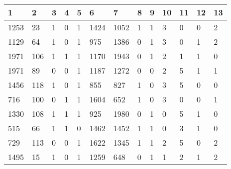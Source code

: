 \begin{table}[H]
\begin{tabular}{|l|l|l|l|l|l|l|l|l|l|l|l|l|}
\hline
\textbf{1} & \textbf{2} & \textbf{3} & \textbf{4} & \textbf{5} & \textbf{6} & \textbf{7} & \textbf{8} & \textbf{9} & \textbf{10} & \textbf{11} & \textbf{12} & \textbf{13} \\ \hline
1253       & 23         & 1          & 0          & 1          & 1424       & 1052       & 1          & 1          & {\color[HTML]{FE0000}3}           & 0           & 0           & 2           \\ \hline
1129       & 64         & 1          & 0          & 1          & 975        & 1386       & 0          & 1          & {\color[HTML]{FE0000}3}           & 0           & 1           & 2           \\ \hline
1971       & 106        & 1          & 1          & 1          & 1170       & 1943       & 0          & 1          & 2           & 1           & 1           & 0           \\ \hline
1971       & 89         & 0          & 0          & 1          & 1187       & 1272       & 0          & 0          & 2           & {\color[HTML]{FE0000}5}           & 1           & 1           \\ \hline
1456       & 118        & 1          & 0          & 1          & 855        & 827        & 1          & 0          & {\color[HTML]{FE0000}3}           & {\color[HTML]{FE0000}5}           & 0           & 0           \\ \hline
716        & 100        & 0          & 1          & 1          & 1604       & 652        & 1          & 0          & {\color[HTML]{FE0000}3}           & 0           & 0           & 1           \\ \hline
1330       & 108        & 1          & 1          & 1          & 925        & 1980       & 0          & 1          & 0           & {\color[HTML]{FE0000}5}           & 1           & 0           \\ \hline
515        & 66         & 1          & 1          & 0          & 1462       & 1452       & 1          & 1          & 0           & 3           & 1           & 0           \\ \hline
729        & 113        & 0          & 0          & 1          & 1622       & 1345       & 1          & 1          & 2           & {\color[HTML]{FE0000}5}           & 0           & 2           \\ \hline
1495       & 15         & 1          & 0          & 1          & 1259       & 648        & 0          & 1          & 1           & 2           & 1           & 2           \\ \hline

\end{tabular}
\end{table}
